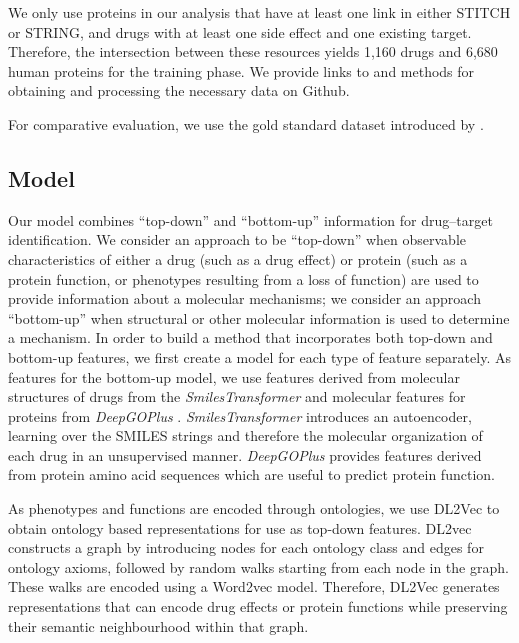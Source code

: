 \documentclass{bioinfo}
\begin{document}
We only use proteins in our analysis that have at least one link in
either STITCH or STRING, and drugs with at least one side effect and
one existing target. Therefore, the intersection between these
resources yields 1,160 drugs and 6,680 human proteins for the training
phase. We provide links to and methods for obtaining and processing
the necessary data on Github.

For comparative evaluation, we use the gold standard dataset
introduced by \citet{Yaminishi2008} .
 
\subsection{Model}

Our model combines ``top-down'' and ``bottom-up'' information for
drug--target identification. We consider an approach to be
``top-down'' when observable characteristics of either a drug (such as
a drug effect) or protein (such as a protein function, or phenotypes
resulting from a loss of function) are used to provide information
about a molecular mechanisms; we consider an approach ``bottom-up''
when structural or other molecular information is used to determine a
mechanism.  In order to build a method that incorporates both top-down
and bottom-up features, we first create a model for each type of
feature separately.  As features for the bottom-up model, we use
features derived from molecular structures of drugs from the
\textit{SmilesTransformer} \citep{SmilesTransformer} and molecular
features for proteins from \textit{DeepGOPlus}
\citep{DeepGoPlus}. \textit{SmilesTransformer} introduces an
autoencoder, learning over the SMILES strings and therefore the
molecular organization of each drug in an unsupervised manner. 
\textit{DeepGOPlus} provides  features derived from protein amino acid
sequences which are useful to predict protein function.

As phenotypes and functions are encoded through ontologies, we use
DL2Vec \citep{DL2vec2020} to obtain ontology based representations for
use as top-down features. DL2vec constructs a graph by introducing
nodes for each ontology class and edges for ontology axioms, followed
by random walks starting from each node in the graph. These walks are
encoded using a Word2vec \citep{Word2vec2013} model. Therefore, DL2Vec
generates representations that can encode drug effects or protein
functions while preserving their semantic neighbourhood within that
graph.
\end{document}
